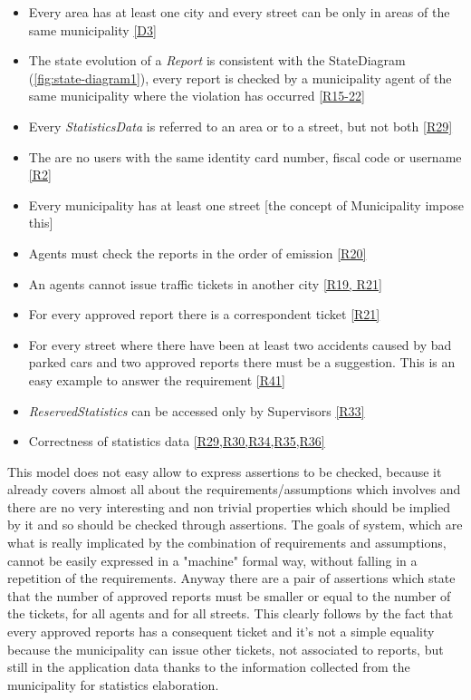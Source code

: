 \documentclass[a4paper]{report}
\begin{document}
\begin{itemize}
\item Every area has at least one city and every street can be only in areas of the same municipality \hyperref[D3]{[D3]}
\item The state evolution of a \textit{Report} is consistent with the StateDiagram (\ref{fig:state-diagram1}), every report is checked by a municipality agent of the same municipality where the violation has occurred \hyperref[R15]{[R15-22]}
\item Every \textit{StatisticsData} is referred to an area or to a street, but not both \hyperref[R29]{[R29]}
\item The are no users with the same identity card number, fiscal code or username \hyperref[R2]{[R2]}
\item Every municipality has at least one street [the concept of Municipality impose this]
\item Agents must check the reports in the order of emission \hyperref[R20]{[R20]}
\item An agents cannot issue traffic tickets in another city \hyperref[R19]{[R19, R21]}
\item For every approved report there is a correspondent ticket \hyperref[R21]{[R21]}
\item For every street where there have been at least two accidents caused by bad parked cars and two approved reports there must be a suggestion. This is an easy example to answer the requirement \hyperref[R41]{[R41]}
\item \textit{ReservedStatistics} can be accessed only by Supervisors \hyperref[R33]{[R33]}
\item Correctness of statistics data \hyperref[R29]{[R29,R30,R34,R35,R36]}
\end{itemize}
This model does not easy allow to express assertions to be checked, because it already covers almost all about the requirements/assumptions which involves and there are no very interesting and non trivial properties which should be implied by it and so should be checked through assertions. The goals of system, which are what is really implicated by the combination of requirements and assumptions, cannot be easily expressed in a "machine" formal way, without falling in a repetition of the requirements. Anyway there are a pair of assertions which state that the number of approved reports must be smaller or equal to the number of the tickets, for all agents and for all streets. This clearly follows by the fact that every approved reports has a consequent ticket and it's not a simple equality because the municipality can issue other tickets, not associated to reports, but still in the application data thanks to the information collected from the municipality for statistics elaboration.\\
\end{document}
